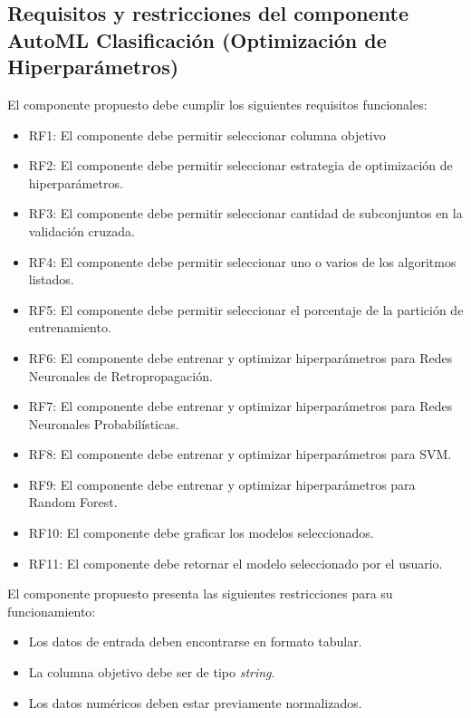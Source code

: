 \subsection{Requisitos y restricciones del componente AutoML Clasificación (Optimización de Hiperparámetros)}
El componente propuesto debe cumplir los siguientes requisitos funcionales:

\begin{itemize}
	\item RF1: El componente debe permitir seleccionar columna objetivo
	\item RF2: El componente debe permitir seleccionar estrategia de optimización de hiperparámetros.
	\item RF3: El componente debe permitir seleccionar cantidad de subconjuntos en la validación cruzada.
	\item RF4: El componente debe permitir seleccionar uno o varios de los algoritmos listados.
	\item RF5: El componente debe permitir seleccionar el porcentaje de la partición de entrenamiento.
	\item RF6: El componente debe entrenar y optimizar hiperparámetros para Redes Neuronales de Retropropagación. 
	\item RF7: El componente debe entrenar y optimizar hiperparámetros para Redes Neuronales Probabilísticas. 
	\item RF8: El componente debe entrenar y optimizar hiperparámetros para SVM.
	\item RF9: El componente debe entrenar y optimizar hiperparámetros para Random Forest.
	\item RF10: El componente debe graficar los modelos seleccionados.
	\item RF11: El componente debe retornar el modelo seleccionado por el usuario.
\end{itemize}

El componente propuesto presenta las siguientes restricciones para su funcionamiento:

\begin{itemize}
	\item Los datos de entrada deben encontrarse en formato tabular.
	\item La columna objetivo debe ser de tipo \textit{string}.
	\item Los datos numéricos deben estar previamente normalizados.
\end{itemize}

